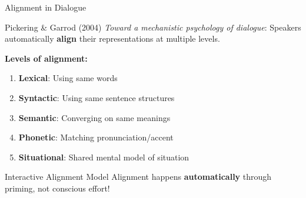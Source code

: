 \documentclass[aspectratio=169]{beamer}
\begin{document}
\begin{frame}{Alignment in Dialogue 🎯}
\small
    \begin{block}{Pickering \& Garrod (2004)}
        \textit{Toward a mechanistic psychology of dialogue}: Speakers automatically \textbf{align} their representations at multiple levels.
    \end{block}

    \vspace{0.3cm}

    \textbf{Levels of alignment:}
    \begin{enumerate}\setlength{\itemsep}{0pt}
        \item \textbf{Lexical}: Using same words
        \item \textbf{Syntactic}: Using same sentence structures
        \item \textbf{Semantic}: Converging on same meanings
        \item \textbf{Phonetic}: Matching pronunciation/accent
        \item \textbf{Situational}: Shared mental model of situation
    \end{enumerate}

    \vspace{0.3cm}

    \begin{alertblock}{Interactive Alignment Model}
        Alignment happens \textbf{automatically} through priming, not conscious effort!
    \end{alertblock}
\end{frame}
\end{document}
